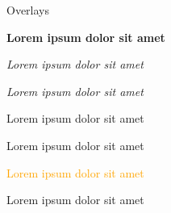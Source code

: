 \documentclass{beamer}
\begin{document}
  
\begin{frame}{Overlays}

\textbf<2>{Lorem ipsum dolor sit amet}

\textit<2>{Lorem ipsum dolor sit amet}

\textsl<2>{Lorem ipsum dolor sit amet}

\textrm<2>{Lorem ipsum dolor sit amet}

\textsf<2>{Lorem ipsum dolor sit amet}

\textcolor<2>{orange}{Lorem ipsum dolor sit amet}

\alert<2>{Lorem ipsum dolor sit amet}


\end{frame}
\end{document}
